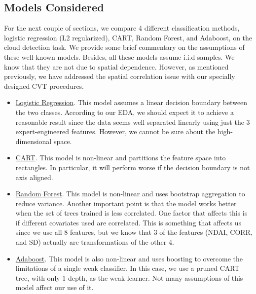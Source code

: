 \documentclass[11pt, letterpaper, journal]{IEEEtran}
\begin{document}
\subsection{Models Considered}
For the next couple of sections, we compare 4 different classification methods, logistic regression (L2 regularized), CART, Random Forest, and Adaboost, on the cloud detection task. We provide some brief commentary on the assumptions of these well-known models. Besides, all these models assume i.i.d samples. We know that they are not due to spatial dependence. However, as mentioned previously, we have addressed the spatial correlation issue with our specially designed CVT procedures. 
\begin{itemize}
    \item \underline{Logistic Regression}. This model assumes a linear decision boundary between the two classes. According to our EDA, we should expect it to achieve a reasonable result since the data seems well separated linearly using just the 3 expert-engineered features. However, we cannot be sure about the high-dimensional space.
    \item \underline{CART}. This model is non-linear and partitions the feature space into rectangles. In particular, it will perform worse if the decision boundary is not axis aligned. 
    \item \underline{Random Forest}. This model is non-linear and uses bootstrap aggregation to reduce variance. Another important point is that the model works better when the set of trees trained is less correlated. One factor that affects this is if different covariates used are correlated. This is something that affects us since we use all 8 features, but we know that 3 of the features (NDAI, CORR, and SD) actually are transformations of the other 4.
    \item \underline{Adaboost}. This model is also non-linear and uses boosting to overcome the limitations of a single weak classifier. In this case, we use a pruned CART tree, with only 1 depth, as the weak learner. Not many assumptions of this model affect our use of it.
\end{itemize}
\end{document}
